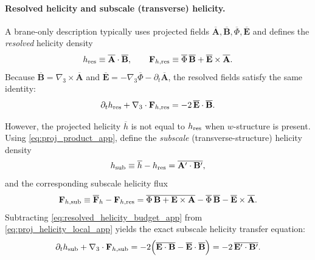 \documentclass[11pt]{article}
\begin{document}
\paragraph{Resolved helicity and subscale (transverse) helicity.}
A brane-only description typically uses projected fields
\(\overline{\mathbf{A}},\overline{\mathbf{B}},\overline{\Phi},\overline{\mathbf{E}}\)
and defines the \emph{resolved} helicity density
\begin{equation}
h_{\rm res}\equiv \overline{\mathbf{A}}\cdot\overline{\mathbf{B}},
\qquad
\mathbf{F}_{h,{\rm res}} \equiv
\overline{\Phi}\,\overline{\mathbf{B}}
+
\overline{\mathbf{E}}\times\overline{\mathbf{A}}.
\label{eq:resolved_helicity_defs_app}
\end{equation}
Because \(\overline{\mathbf{B}}=\nabla_3\times\overline{\mathbf{A}}\) and
\(\overline{\mathbf{E}}=-\nabla_3\overline{\Phi}-\partial_t\overline{\mathbf{A}}\),
the resolved fields satisfy the same identity:
\begin{equation}
\partial_t h_{\rm res}
+
\nabla_3\cdot \mathbf{F}_{h,{\rm res}}
=
-2\,\overline{\mathbf{E}}\cdot\overline{\mathbf{B}}.
\label{eq:resolved_helicity_budget_app}
\end{equation}

However, the projected helicity \(\overline{h}\) is not equal to \(h_{\rm res}\) when
\(w\)-structure is present. Using \eqref{eq:proj_product_app}, define the \emph{subscale}
(transverse-structure) helicity density
\begin{equation}
h_{\rm sub}
\equiv
\overline{h}-h_{\rm res}
=
\overline{\mathbf{A}'\cdot\mathbf{B}'},
\label{eq:subscale_helicity_def_app}
\end{equation}
and the corresponding subscale helicity flux
\begin{equation}
\mathbf{F}_{h,{\rm sub}}
\equiv
\overline{\mathbf{F}}_h - \mathbf{F}_{h,{\rm res}}
=
\overline{\Phi\,\mathbf{B}+\mathbf{E}\times\mathbf{A}}
-
\overline{\Phi}\,\overline{\mathbf{B}}
-
\overline{\mathbf{E}}\times\overline{\mathbf{A}}.
\label{eq:subscale_helicity_flux_app}
\end{equation}
Subtracting \eqref{eq:resolved_helicity_budget_app} from \eqref{eq:proj_helicity_local_app} yields
the exact subscale helicity transfer equation:
\begin{equation}
\partial_t h_{\rm sub}
+
\nabla_3\cdot \mathbf{F}_{h,{\rm sub}}
=
-2\Big(
\overline{\mathbf{E}\cdot\mathbf{B}}
-
\overline{\mathbf{E}}\cdot\overline{\mathbf{B}}
\Big)
=
-2\,\overline{\mathbf{E}'\cdot\mathbf{B}'}.
\label{eq:subscale_helicity_budget_app}
\end{equation}
\end{document}

